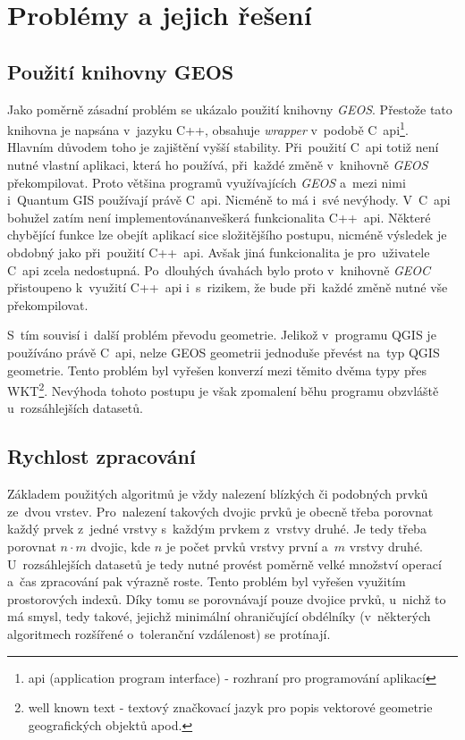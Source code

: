 \chapter{Problémy a jejich řešení}
\label{6-problemy}

\section{Použití knihovny GEOS}
\label{geos problem}

Jako poměrně zásadní problém se ukázalo použití knihovny \textit{GEOS}. Přestože tato knihovna je napsána v~jazyku C++, obsahuje \textit{wrapper} v~podobě C~api\footnote{api
(application program interface) - rozhraní pro programování aplikací}. Hlavním důvodem toho je zajištění vyšší stability. Při~použití C~api totiž není nutné vlastní aplikaci,
která ho používá, při~každé změně v~knihovně \textit{GEOS} překompilovat. Proto většina programů využívajících \textit{GEOS} a~mezi nimi i~Quantum GIS používají právě C~api. 
Nicméně to má i~své nevýhody. V~C~api bohužel zatím není implementovánanveškerá funkcionalita C++~api. Některé chybějící funkce lze obejít aplikací sice složitějšího postupu,
nicméně výsledek je obdobný jako při~použití C++~api. Avšak jiná funkcionalita je pro~uživatele C~api zcela nedostupná. Po~dlouhých úvahách bylo proto v~knihovně \textit{GEOC}
přistoupeno k~využití C++~api i~s~rizikem, že bude při~každé změně nutné vše překompilovat.  

S~tím souvisí i~další problém převodu geometrie. Jelikož v~programu QGIS je používáno právě C~api, nelze GEOS geometrii jednoduše převést na~typ QGIS geometrie. Tento problém
byl vyřešen konverzí mezi těmito dvěma typy přes WKT\footnote{well known text - textový značkovací jazyk pro popis vektorové geometrie geografických objektů apod.}. Nevýhoda
tohoto postupu je však zpomalení běhu programu obzvláště u~rozsáhlejších datasetů.   

\section{Rychlost zpracování}
\label{rychlost}

Základem použitých algoritmů je vždy nalezení blízkých či podobných prvků ze~dvou vrstev. Pro~nalezení takových dvojic prvků je obecně třeba porovnat každý prvek z~jedné
vrstvy s~každým prvkem z~vrstvy druhé. Je tedy třeba porovnat $n\cdot m$ dvojic, kde $n$ je počet prvků vrstvy první a~$m$ vrstvy druhé. U~rozsáhlejších datasetů je tedy
nutné provést poměrně velké množství operací a~čas zpracování pak výrazně roste. Tento problém byl vyřešen využitím prostorových indexů. Díky tomu se porovnávají pouze
dvojice prvků, u~nichž to má smysl, tedy takové, jejichž minimální ohraničující obdélníky (v~některých algoritmech rozšířené o~toleranční vzdálenost) se protínají.